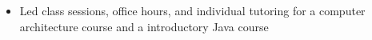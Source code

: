 \begin{itemize}
    \item Led class sessions, office hours, and individual tutoring for a computer architecture course and a introductory Java course
\end{itemize}